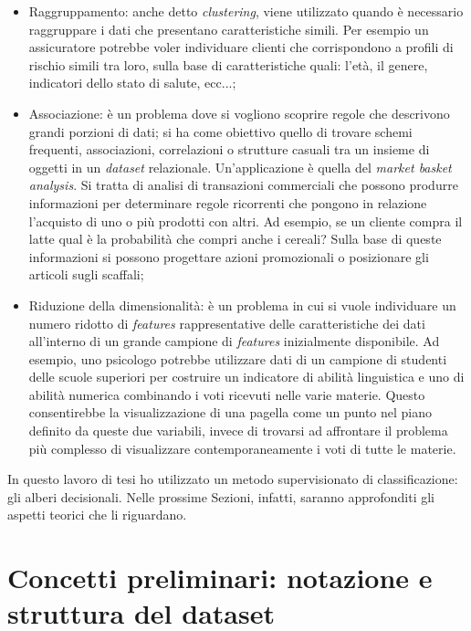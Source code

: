 \begin{itemize}
    \item Raggruppamento: anche detto \textit{clustering}, viene utilizzato quando è necessario raggruppare i dati che presentano caratteristiche simili. Per esempio un assicuratore potrebbe voler individuare clienti che corrispondono a profili di rischio simili tra loro, sulla base di caratteristiche quali: l'età, il genere, indicatori dello stato di salute, ecc...;
    \item Associazione: è un problema dove si vogliono scoprire regole che descrivono grandi porzioni di dati; si ha come obiettivo quello di trovare schemi frequenti, associazioni, correlazioni o strutture casuali tra un insieme di oggetti in un \textit{dataset} relazionale. Un'applicazione è quella del \textit{market basket analysis}. Si tratta di analisi di transazioni commerciali che possono produrre informazioni per determinare regole ricorrenti che pongono in relazione l’acquisto di uno o più prodotti con altri. Ad esempio, se un cliente compra il latte qual è la probabilità che compri anche i cereali? Sulla base di queste informazioni si possono progettare azioni promozionali o posizionare gli articoli sugli scaffali;
    \item Riduzione della dimensionalità: è un problema in cui si vuole individuare un numero ridotto di \textit{features} rappresentative delle caratteristiche dei dati all'interno di un grande campione di \textit{features} inizialmente disponibile. Ad esempio, uno psicologo potrebbe utilizzare dati di un campione di studenti delle scuole superiori per costruire un indicatore di abilità linguistica e uno di abilità numerica combinando i voti ricevuti nelle varie materie. Questo consentirebbe la visualizzazione di una pagella come un punto nel piano definito da queste due variabili, invece di trovarsi ad affrontare il problema più complesso di visualizzare contemporaneamente i voti di tutte le materie.
\end{itemize}

In questo lavoro di tesi ho utilizzato un metodo supervisionato  di classificazione: gli alberi decisionali.  Nelle prossime Sezioni, infatti, saranno approfonditi gli aspetti teorici che li riguardano. 

\section{Concetti preliminari: notazione e struttura del dataset}
\label{sec:dataset_class}

